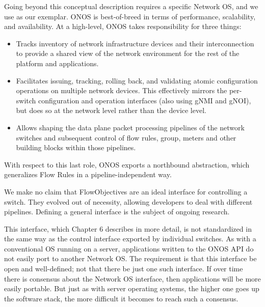 \documentclass[letterpaper,11pt,english]{sphinxmanual}
\begin{document}
Going beyond this conceptual description requires a specific Network
OS, and we use  as our
exemplar. ONOS is best-of-breed in terms of performance, scalability,
and availability. At a high-level, ONOS takes responsibility for three
things:
\begin{itemize}
\item {} 
 Tracks inventory of network infrastructure
devices and their interconnection to provide a shared view of the
network environment for the rest of the platform and applications.

\item {} 
 Facilitates issuing, tracking, rolling
back, and validating atomic configuration operations on multiple
network devices. This effectively mirrors the per-switch
configuration and operation interfaces (also using gNMI and gNOI),
but does so at the network level rather than the device level.

\item {} 
 Allows shaping the data plane packet
processing pipelines of the network switches and subsequent control
of flow rules, group, meters and other building blocks within those
pipelines.

\end{itemize}

With respect to this last role, ONOS exports a northbound
 abstraction, which generalizes Flow Rules in a
pipeline-independent way.%
\begin{footnote}[2]\sphinxAtStartFootnote
We make no claim that FlowObjectives are an ideal interface for
controlling a switch. They evolved out of necessity, allowing
developers to deal with different pipelines. Defining a general
interface is the subject of ongoing research.
%
\end{footnote} This interface, which Chapter 6
describes in more detail, is not standardized in the same way as the
control interface exported by individual switches. As with a
conventional OS running on a server, applications written to the ONOS
API do not easily port to another Network OS. The requirement is that
this interface be open and well-defined; not that there be just one
such interface. If over time there is consensus about the Network OS
interface, then applications will be more easily portable. But just as
with server operating systems, the higher one goes up the software
stack, the more difficult it becomes to reach such a consensus.
\end{document}
